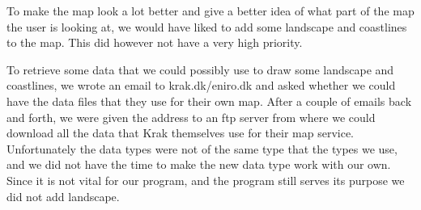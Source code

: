 To make the map look a lot better and give a better idea of what part of the map the user is looking at, we would have liked to add some landscape and coastlines to the map. This did however not have a very high priority. 

To retrieve some data that we could possibly use to draw some landscape and coastlines, we wrote an email to krak.dk/eniro.dk and asked whether we could have the data files that they use for their own map. After a couple of emails back and forth, we were given the address to an ftp server from where we could download all the data that Krak themselves use for their map service. Unfortunately the data types were not of the same type that the types we use, and we did not have the time to make the new data type work with our own. Since it is not vital for our program, and the program still serves its purpose we did not add landscape.